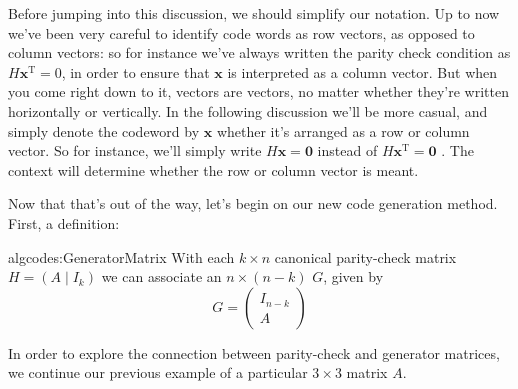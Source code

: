 Before jumping into this discussion, we should simplify our notation. Up to now we've been very careful to identify code words as row vectors, as opposed to column vectors: so for instance we've always written the parity check condition as $H \textbf{x}^\textrm{T} = 0$, in order to ensure that $\textbf{x}$ is interpreted as a column vector.  But when you come right down to it, vectors are vectors, no matter whether they're written horizontally or vertically. In the following discussion we'll be  more casual, and simply denote the codeword by $\textbf{x}$ whether it's arranged as a row or column vector. So for instance, we'll simply write $H \textbf{x} = \textbf{0}$ instead of  $H \textbf{x}^\textrm{T} = \textbf{0}$ . The context will determine whether the row or column vector is meant.

Now that that's out of the way,  let's begin on our new code generation method.  First, a definition:

\begin{defn}{algcodes:GeneratorMatrix}
With each $k \times n$ canonical parity-check matrix 
$H= (A \mid I_k)$
we can associate an $n \times
(n-k)$  $G$, given by 
\[
G =
\left(
 \begin{array}{c}
 I_{n-k} \\
A
 \end{array} \right)
\]
\end{defn}

In order to explore the connection between parity-check and generator matrices, we continue our previous example of a particular $3 \times 3$ matrix $A$.

